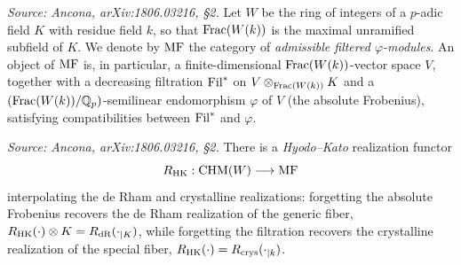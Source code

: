 \begin{definition}
  \label{def:filtered-phi-modules}
  \textit{Source: Ancona, arXiv:1806.03216, §2.}
  Let \(W\) be the ring of integers of a \(p\)-adic field \(K\) with residue
  field \(k\), so that \(\mathrm{Frac}(W(k))\) is the maximal unramified subfield of
  \(K\). We denote by \(\mathrm{MF}\) the category of \emph{admissible filtered
  \(\varphi\)-modules}. An object of \(\mathrm{MF}\) is, in particular, a
  finite-dimensional \(\mathrm{Frac}(W(k))\)-vector space \(V\), together with a
  decreasing filtration \(\mathrm{Fil}^*\) on \(V \otimes_{\mathrm{Frac}(W(k))} K\) and a
  \((\mathrm{Frac}(W(k))/\mathbb{Q}_p)\)-semilinear endomorphism \(\varphi\) of \(V\) (the
  absolute Frobenius), satisfying compatibilities between \(\mathrm{Fil}^*\) and
  \(\varphi\).
\end{definition}

\begin{definition}
  \label{def:hyodo-kato}
  \textit{Source: Ancona, arXiv:1806.03216, §2.}
  There is a \emph{Hyodo--Kato} realization functor
  \[R_{\mathrm{HK}} : \mathrm{CHM}(W) \longrightarrow \mathrm{MF}\]
  interpolating the de Rham and crystalline realizations: forgetting the absolute
  Frobenius recovers the de Rham realization of the generic fiber,
  \(R_{\mathrm{HK}}(\cdot) \otimes K = R_{\mathrm{dR}}(\cdot_{|K})\), while forgetting the
  filtration recovers the crystalline realization of the special fiber,
  \(R_{\mathrm{HK}}(\cdot) = R_{\mathrm{crys}}(\cdot_{|k})\).
\end{definition}

